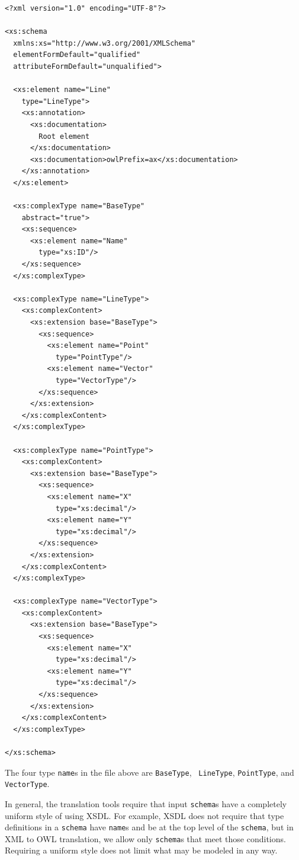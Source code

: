 \documentclass[preprint,12pt]{elsarticle}
\begin{document}
\begin{verbatim}
<?xml version="1.0" encoding="UTF-8"?>

<xs:schema
  xmlns:xs="http://www.w3.org/2001/XMLSchema"
  elementFormDefault="qualified"
  attributeFormDefault="unqualified">

  <xs:element name="Line"
    type="LineType">
    <xs:annotation>
      <xs:documentation>
        Root element
      </xs:documentation>
      <xs:documentation>owlPrefix=ax</xs:documentation>
    </xs:annotation>
  </xs:element>

  <xs:complexType name="BaseType"
    abstract="true">
    <xs:sequence>
      <xs:element name="Name"
        type="xs:ID"/>
    </xs:sequence>
  </xs:complexType>

  <xs:complexType name="LineType">
    <xs:complexContent>
      <xs:extension base="BaseType">
        <xs:sequence>
          <xs:element name="Point"
            type="PointType"/>
          <xs:element name="Vector"
            type="VectorType"/>
        </xs:sequence>
      </xs:extension>
    </xs:complexContent>
  </xs:complexType>

  <xs:complexType name="PointType">
    <xs:complexContent>
      <xs:extension base="BaseType">
        <xs:sequence>
          <xs:element name="X"
            type="xs:decimal"/>
          <xs:element name="Y"
            type="xs:decimal"/>
        </xs:sequence>
      </xs:extension>
    </xs:complexContent>
  </xs:complexType>

  <xs:complexType name="VectorType">
    <xs:complexContent>
      <xs:extension base="BaseType">
        <xs:sequence>
          <xs:element name="X"
            type="xs:decimal"/>
          <xs:element name="Y"
            type="xs:decimal"/>
        </xs:sequence>
      </xs:extension>
    </xs:complexContent>
  </xs:complexType>

</xs:schema>
\end{verbatim}

The four type {\tt name}s in the file above are {\tt BaseType}, {\tt
  LineType}, {\tt PointType}, and {\tt VectorType}.

In general, the translation tools require that input {\tt schema}s have a
completely uniform style of using XSDL. For example, XSDL does not require
that type definitions in a {\tt schema} have {\tt name}s and be at the top
level of the {\tt schema}, but in XML to OWL translation, we allow only
{\tt schema}s that meet those conditions. Requiring a uniform style does
not limit what may be modeled in any way.
\end{document}
